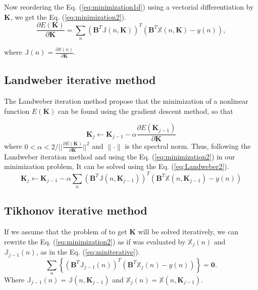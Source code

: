 \documentclass[review]{elsarticle}
\begin{document}
Now reordering the Eq. 
(\ref{eq:minimization1d}) using a vectorial differentiation by $\mathbf{K}$, we get the 
Eq. (\ref{eq:minimization2}).
\begin{equation}\label{eq:minimization2}
 \frac{\partial E(\mathbf{K})}{\partial \mathbf{K}}=\sum_{n}{ \left( \mathbf{B}^{T}\mathbb{J}(n,\mathbf{K})\right)^{T} \left(\mathbf{B}^{T}\mathbb{X}(n,\mathbf{K}) -y(n) \right) },
\end{equation}

where $\mathbb{J}(n)=\frac{\partial \mathbb{X}(n)}{\partial \mathbf{K}}$.

\subsection{Landweber iterative method}
The Landweber iteration method propose that 
the minimization of a nonlinear function $E(\mathbf{K})$ can be found using
the gradient descent method, so that 

\begin{equation}\label{eq:Landweber1}
\mathbf{K}_{j}\leftarrow \mathbf{K}_{j-1} - \alpha \frac{\partial E(\mathbf{K}_{j-1})}{\partial \mathbf{K}}
\end{equation}
where $0 < \alpha < 2/||\frac{\partial E(\mathbf{K})}{\partial \mathbf{K}}||^2$ and
$\|\cdot \|$ is the spectral norm. Thus, following the Landweber iteration method
and using the Eq. (\ref{eq:minimization2}) in
our minimization problem, It can be solved using the Eq. (\ref{eq:Landweber2}).
\begin{equation}\label{eq:Landweber2}
\mathbf{K}_{j}\leftarrow \mathbf{K}_{j-1} 
- \alpha \sum_{n}{ \left( \mathbf{B}^{T}\mathbb{J}(n,\mathbf{K}_{j-1})\right)^{T} \left(\mathbf{B}^{T}\mathbb{X}(n,\mathbf{K}_{j-1}) -y(n) \right) }
\end{equation}
\subsection{Tikhonov iterative method}

If we assume that the problem of to get $\mathbf{K}$ will be solved iteratively, 
we can  rewrite the Eq. (\ref{eq:minimization2}) as if was evaluated by $\mathbb{X}_{j}(n)$
and $\mathbb{J}_{j-1}(n)$, as in the Eq. (\ref{eq:miniterative}).
\begin{equation}\label{eq:miniterative}
\sum_{n}{\left\{ \left( \mathbf{B}^{T}\mathbb{J}_{j-1}(n)\right)^{T} \left(\mathbf{B}^{T}\mathbb{X}_{j}(n) - y(n)  \right) \right \}}=\mathbf{0}.
\end{equation}
Where $\mathbb{J}_{j-1}(n)=\mathbb{J}(n,\mathbf{K}_{j-1})$ and
$\mathbb{X}_{j}(n)=\mathbb{X}(n,\mathbf{K}_{j-1})$.
\end{document}
